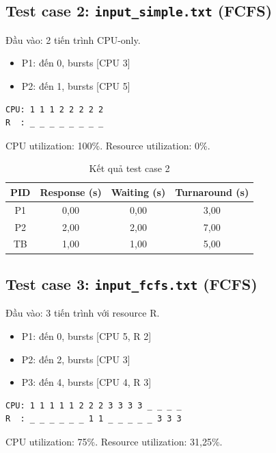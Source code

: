 \subsection{Test case 2: \texttt{input\_simple.txt} (FCFS)}

Đầu vào: 2 tiến trình CPU-only.

\begin{itemize}
    \item P1: đến 0, bursts [CPU 3]
    \item P2: đến 1, bursts [CPU 5]
\end{itemize}

\begin{verbatim}
CPU: 1 1 1 2 2 2 2 2
R  : _ _ _ _ _ _ _ _
\end{verbatim}

CPU utilization: 100\%. Resource utilization: 0\%.

\begin{table}[h]
\centering
\begin{tabular}{|c|c|c|c|}
\hline
PID & Response (s) & Waiting (s) & Turnaround (s) \\
\hline
P1 & 0,00 & 0,00 & 3,00 \\
P2 & 2,00 & 2,00 & 7,00 \\
\hline
TB & 1,00 & 1,00 & 5,00 \\
\hline
\end{tabular}
\caption{Kết quả test case 2}
\end{table}

\subsection{Test case 3: \texttt{input\_fcfs.txt} (FCFS)}

Đầu vào: 3 tiến trình với resource R.

\begin{itemize}
    \item P1: đến 0, bursts [CPU 5, R 2]
    \item P2: đến 2, bursts [CPU 3]
    \item P3: đến 4, bursts [CPU 4, R 3]
\end{itemize}

\begin{verbatim}
CPU: 1 1 1 1 1 2 2 2 3 3 3 3 _ _ _ _
R  : _ _ _ _ _ _ 1 1 _ _ _ _ _ 3 3 3
\end{verbatim}

CPU utilization: 75\%. Resource utilization: 31,25\%.

